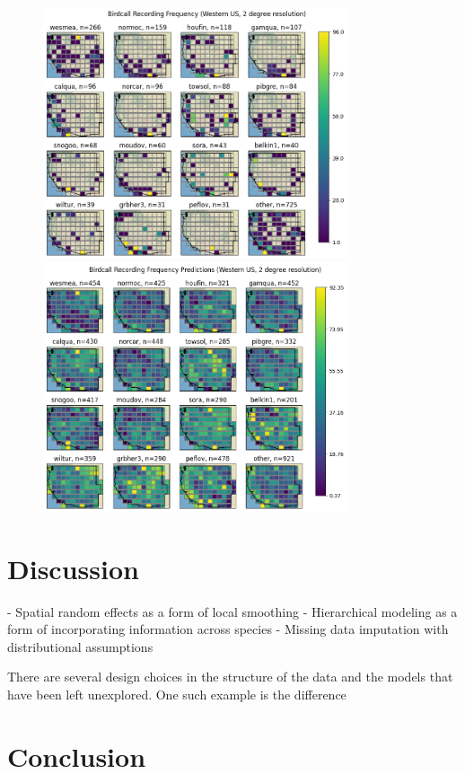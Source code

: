 \documentclass[notitlepage]{article}
\begin{document}
\begin{figure}[ht!]
\centering
\includegraphics[width=0.8\textwidth]{report/figures/western_us_raw_16.png}
\includegraphics[width=0.8\textwidth]{report/figures/western_us_predict_16.png}
\end{figure}


\section{Discussion}

- Spatial random effects as a form of local smoothing
- Hierarchical modeling as a form of incorporating information across species
- Missing data imputation with distributional assumptions

There are several design choices in the structure of the data and the models that have been left unexplored. One such example is the difference 

\section{Conclusion}

\printbibliography
\end{document}
